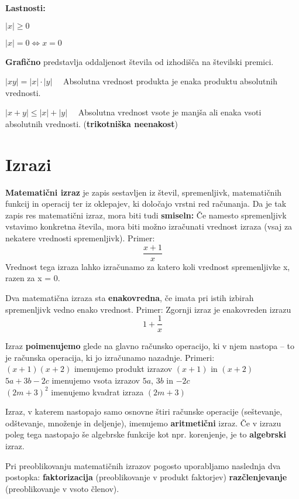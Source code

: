 \documentclass[a4paper,oneside,12pt,fleqn]{article}
\newcommand\krat\cdot
\renewcommand\iff\Leftrightarrow
\numberwithin{equation}{section}
\newenvironment{itemize*}%
{
\vspace{-12pt}%
\begin{itemize}%
\setlength{\itemsep}{0pt}%
\setlength{\parskip}{2pt}}%
{\end{itemize}}
\begin{document}
\textbf{Lastnosti:}
\begin{itemize*}
  \item $|x| \geq 0$
  \item $|x| = 0 \iff x = 0$
  \item \textbf{Grafično} predstavlja oddaljenost števila od izhodišča na številski premici.
  \item $|xy| = |x| \krat |y| \quad$ Absolutna vrednost produkta je enaka produktu
    absolutnih vrednosti.
  \item $|x+y| \leq |x| + |y| \quad$ Absolutna vrednost vsote je manjša ali enaka vsoti
    absolutnih vrednosti. (\textbf{trikotniška neenakost})
\end{itemize*}

\section{Izrazi}
\label{sec:izr}
\textbf{Matematični izraz} je zapis sestavljen iz števil, spremenljivk, matematičnih funkcij in
operacij ter iz oklepajev, ki določajo vrstni red računanja. Da je tak zapis res
matematični izraz, mora biti tudi \textbf{smiseln:} Če namesto spremenljivk vstavimo konkretna
števila, mora biti možno izračunati vrednost izraza (vsaj za nekatere vrednosti
spremenljivk).
Primer:
\[ \frac{x + 1}{x} \]
Vrednost tega izraza lahko izračunamo za katero koli vrednost
spremenljivke x, razen za x = 0.

Dva matematična izraza sta \textbf{enakovredna}, če imata pri istih izbirah spremenljivk vedno
enako vrednost.
Primer: Zgornji izraz je enakovreden izrazu
\[ 1 + \frac{1}{x} \]

Izraz \textbf{poimenujemo} glede na glavno računsko operacijo, ki v njem nastopa -- to je računska
operacija, ki jo izračunamo nazadnje.
Primeri: \\
$(x + 1)(x + 2)$ imenujemo produkt izrazov $(x + 1)$ in $(x + 2)$ \\
$5a + 3b - 2c$ imenujemo vsota izrazov $5a$, $3b$ in $-2c$ \\
$(2m + 3)^2$ imenujemo kvadrat izraza $(2m + 3)$

Izraz, v katerem nastopajo samo osnovne štiri računske operacije (seštevanje, odštevanje,
množenje in deljenje), imenujemo \textbf{aritmetični} izraz. Če v izrazu poleg tega nastopajo še
algebrske funkcije kot npr. korenjenje, je to \textbf{algebrski} izraz.

Pri preoblikovanju matematičnih izrazov pogosto uporabljamo naslednja dva postopka:
\textbf{faktorizacija} (preoblikovanje v produkt faktorjev)
\textbf{razčlenjevanje} (preoblikovanje v vsoto členov).
\end{document}
